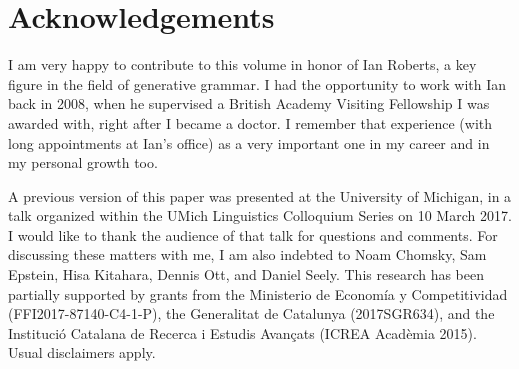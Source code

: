 \documentclass[output=paper]{langsci/langscibook}
\begin{document}
\printchapterglossary{}

\section*{Acknowledgements}

I am very happy to contribute to this volume in honor of Ian Roberts, a key
figure in the field of generative grammar. I had the opportunity to work with
Ian back in 2008, when he supervised a British Academy Visiting Fellowship I
was awarded with, right after I became a doctor. I remember that experience
(with long appointments at Ian's office) as a very important one in my career
and in my personal growth too.

A previous version of this paper was presented at the University of Michigan,
in a talk organized within the UMich Linguistics Colloquium Series on 10 March
2017. I would like to thank the audience of that talk for questions and
comments. For discussing these matters with me, I am also indebted to Noam
Chomsky, Sam Epstein, Hisa Kitahara, Dennis Ott, and Daniel Seely. This
research has been partially supported by grants from the Ministerio de Economía
y Competitividad (FFI2017-87140-C4-1-P), the Generalitat de Catalunya
(2017SGR634), and the Institució Catalana de Recerca i Estudis Avançats
(ICREA Acadèmia 2015). Usual disclaimers apply.

{\sloppy
\printbibliography[heading=subbibliography,notkeyword=this]
}
\end{document}
